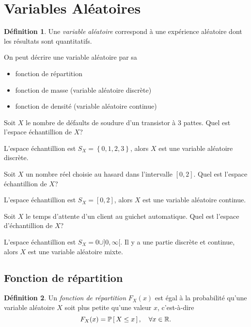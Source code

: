 \documentclass[11pt]{article}
\makeatletter
\renewcommand\P[1]{%
	\ensuremath{%
		\mathbb{P}\left[\,#1\,\right]%
	}%
}%
\theoremstyle{remark}
\theoremstyle{definition}
\newtheorem*{@definition}{Définition}
\newenvironment{definition}{%
	\begin{@definition}%
}{%
	\end{@definition}%
	\setcounter{property}{0}%
}
\makeatother
\begin{document}
\section{Variables Aléatoires}
\begin{definition}
	Une \textit{variable aléatoire} correspond à une expérience aléatoire dont
	les résultats sont quantitatifs.
\end{definition}

On peut décrire une variable aléatoire par sa
\begin{itemize}
	\item fonction de répartition
	\item fonction de masse (variable aléatoire discrète)
	\item fonction de densité (variable aléatoire continue)
\end{itemize}

\begin{exemple}
	Soit $X$ le nombre de défaults de soudure d'un transistor à 3 pattes. Quel
	est l'espace échantillion de $X$?

	L'espace échantillion est $S_X=\left\{0,1,2,3\right\}$, alors $X$ est une
	variable aléatoire discrète.
\end{exemple}

\begin{exemple}
	Soit $X$ un nombre réel choisie au hasard dans l'intervalle $[0,2]$. Quel
	est l'espace échantillion de $X$?

	L'espace échantillion est $S_X=[0,2]$, alors $X$ est une variable aléatoire
	continue.
\end{exemple}

\begin{exemple}
	Soit $X$ le temps d'attente d'un client au guichet automatique. Quel est
	l'espace d'échantillion de $X$?

	L'espace échantillion est $S_X={0}\cup]0,\infty[$. Il y a une partie
	discrète et continue, alors $X$ est une variable aléatoire mixte.
\end{exemple}

\subsection{Fonction de répartition}
\begin{definition}
	Un \textit{fonction de répartition} $F_X(x)$ est égal à la probabilité
	qu'une variable aléatoire $X$ soit plus petite qu'une valeur $x$,
	c'est-à-dire
	\begin{equation*}
		F_X(x)=\P{X\leq x},\quad\forall x\in\mathbb{R}.
	\end{equation*}
\end{definition}
\end{document}
